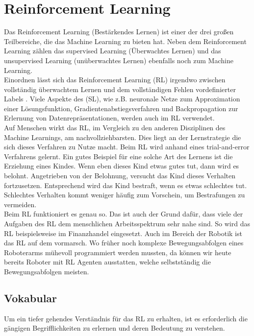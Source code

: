 \section{Reinforcement Learning}
Das Reinforcement Learning (Bestärkendes Lernen) ist einer der drei großen Teilbereiche, die das Machine Learning zu bieten hat. Neben dem Reinforcement Learning zählen das supervised Learning (Überwachtes Lernen) und das unsupervised Learning (unüberwachtes Lernen) ebenfalls noch zum Machine Learning.\\
Einordnen lässt sich das Reinforcement Learning (RL) irgendwo zwischen vollständig überwachtem Lernen und dem vollständigen Fehlen vordefinierter Labels \cite[S. 26]{DRL_Lapan}. Viele Aspekte des (SL), wie z.B. neuronale Netze zum Approximation einer Lösungsfunktion, Gradientenabstiegsverfahren und Backpropagation zur Erlernung von Datenrepräsentationen, werden auch im RL verwendet.\\
Auf Menschen wirkt das RL, im Vergleich zu den anderen Disziplinen des Machine Learnings, am nachvollziehbarsten. Dies liegt an der Lernstrategie die sich dieses Verfahren zu Nutze macht. Beim RL wird anhand eines 
\grqq trial-and-error\glqq{} Verfahrens gelernt. Ein gutes Beispiel für eine solche Art des Lernens ist die Erziehung eines Kindes. Wenn eben dieses Kind etwas gutes tut, dann wird es belohnt. Angetrieben von der Belohnung, versucht das Kind dieses Verhalten fortzusetzen. Entsprechend wird das Kind bestraft, wenn es etwas schlechtes tut. Schlechtes Verhalten kommt weniger häufig zum Vorschein, um Bestrafungen zu vermeiden. \cite[S.1 ff.]{Sutton1998}\\
Beim RL funktioniert es genau so. Das ist auch der Grund dafür, dass viele der Aufgaben des RL dem menschlichen Arbeitsspektrum sehr nahe sind. So wird das RL beispielsweise im Finanzhandel eingesetzt. Auch im Bereich der Robotik ist das RL auf dem vormarsch. Wo früher noch komplexe Bewegungsabfolgen eines Roboterarms mühevoll programmiert werden mussten, da können wir heute bereits Roboter mit RL Agenten ausstatten, welche selbstständig die Bewegungsabfolgen meisten. \cite[Kapitel 18]{DRL_Lapan}

\subsection{Vokabular}
Um ein tiefer gehendes Verständnis für das RL zu erhalten, ist es erforderlich die gängigen Begrifflichkeiten zu erlernen und deren Bedeutung zu verstehen.

